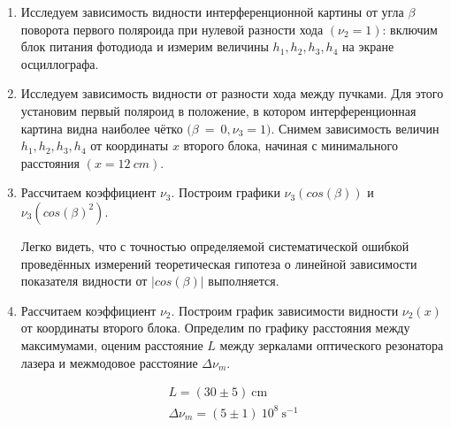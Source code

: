 \begin{enumerate}

    \item 
    Исследуем зависимость видности интерференционной картины от угла $\beta$ поворота первого поляроида при нулевой разности хода $(\nu_2 = 1)$: включим блок питания фотодиода и измерим величины $h_1, h_2, h_3, h_4$ на экране осциллографа. 
    
    \item
    Исследуем зависимость видности от разности хода между пучками. Для этого установим первый поляроид в положение, в котором интерференционная картина видна наиболее чётко $(\beta~=~0$\textdegree$, \nu_3 = 1)$. Снимем зависимость величин $h_1, h_2, h_3, h_4$ от координаты $x$ второго блока, начиная с минимального расстояния $(x = 12~cm)$.
    
    \item
    Рассчитаем коэффициент $\nu_3$. Построим графики $\nu_3(cos(\beta))$ и $\nu_3(cos(\beta)^2)$. 
    
    \begin{figure}[h]
    \end{figure}
    
    Легко видеть, что с точностью определяемой систематической ошибкой проведённых измерений теоретическая гипотеза о линейной зависимости показателя видности от $|cos(\beta)|$ выполняется.
    
    \begin{figure}[h]
    \end{figure}
    
    \item
    Рассчитаем коэффициент $\nu_2$. Построим график зависимости видности $\nu_2(x)$ от координаты второго блока. Определим по графику расстояния между максимумами, оценим расстояние $L$ между зеркалами оптического резонатора лазера и межмодовое расстояние $\Delta \nu_m$. 
    
    \begin{figure}[h]
    \end{figure}
    
    \begin{gather*}
        L = (30 \pm 5)~\text{cm}\\
        \Delta \nu_m = (5 \pm 1)~10^{8}~\text{s}^{-1}\\
    \end{gather*}


\end{enumerate}
